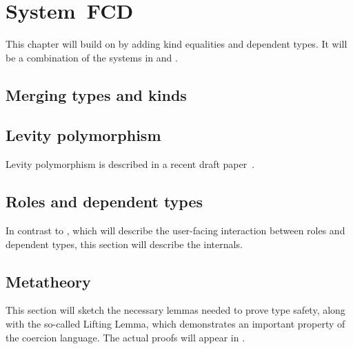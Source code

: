 \chapter{System~FCD}
\label{cha:fcd}

\begin{proposal}
This chapter will build on  by adding kind equalities
and dependent types. It will be a combination of the systems in \citet{nokinds}
and \citet{gundry-thesis}.
\end{proposal}

\section{Merging types and kinds}

\section{Levity polymorphism}

\begin{proposal}
Levity polymorphism is described in a recent draft paper~\cite{equalities}.
\end{proposal}

\section{Roles and dependent types}

\begin{proposal}
In contrast to , which will describe
the user-facing interaction between roles and dependent types, this section
will describe the internals.
\end{proposal}

\section{Metatheory}

\begin{proposal}
This section will sketch the necessary lemmas needed to prove type safety,
along with the so-called Lifting Lemma, which demonstrates an important
property of the coercion language. The actual proofs will appear in
.
\end{proposal}


